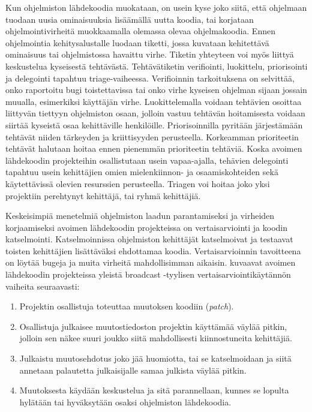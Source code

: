 \documentclass[utf8]{gradu3}
\begin{document}
Kun ohjelmiston lähdekoodia muokataan, on usein kyse joko siitä, että ohjelmaan
tuodaan uusia ominaisuuksia lisäämällä uutta koodia, tai korjataan 
ohjelmointivirheitä muokkaamalla olemassa olevaa ohjelmakoodia.
Ennen ohjelmointia kehitysalustalle luodaan tiketti, jossa kuvataan
kehitettävä ominaisuus tai ohjelmistossa havaittu virhe. Tiketin yhteyteen voi
myös liittyä keskustelua kyseisestä tehtävästä. Tehtävätiketin verifiointi,
luokittelu, priorisointi ja delegointi tapahtuu triage-vaiheessa. Verifioinnin
tarkoituksena on selvittää, onko raportoitu bugi toistettavissa tai onko virhe
kyseisen ohjelman sijaan jossain muualla, esimerkiksi käyttäjän virhe.
Luokittelemalla voidaan tehtävien osoittaa liittyvän tiettyyn ohjelmiston osaan,
jolloin vastuu tehtävän hoitamisesta voidaan siirtää kyseistä osaa kehittäville
henkilöille. Priorisoinnilla pyritään järjestämään tehtävät niiden tärkeyden ja
kriittisyyden perusteella. Korkeamman prioriteetin tehtävät halutaan hoitaa
ennen pienemmän prioriteetin tehtäviä. Koska avoimen lähdekoodin projekteihin
osallistutaan usein vapaa-ajalla, tehävien delegointi tapahtuu usein kehittäjien
omien mielenkiinnon- ja osaamiskohteiden sekä käytettävissä olevien resurssien
perusteella. Triagen voi hoitaa joko yksi projektiin perehtynyt kehittäjä, tai
ryhmä kehittäjiä.


Keskeisimpiä menetelmiä ohjelmiston laadun parantamiseksi ja virheiden
korjaamiseksi avoimen lähdekoodin projekteissa on vertaisarviointi ja koodin
katselmointi. \parencite{Rigby-2014} Katselmoinnissa ohjelmiston kehittäjät
katselmoivat ja testaavat toisten kehittäjien lisättäväksi ehdottamaa koodia.
Vertaisarvioinnin tavoitteena on löytää bugeja ja muita virheitä mahdollisimman
aikaisin. \textcite{Rigby-2014} kuvaavat avoimen lähdekoodin projekteissa
yleistä broadcast -tyylisen vertaisarviointikäytännön vaiheita seuraavasti:
\begin{enumerate}
  \item Projektin osallistuja toteuttaa muutoksen koodiin (\textit{patch}).
  \item Osallistuja julkaisee muutostiedoston projektin käyttämää väylää pitkin,
        jolloin sen näkee suuri joukko siitä mahdollisesti kiinnostuneita
        kehittäjiä.
  \item Julkaistu muutosehdotus joko jää huomiotta, tai se katselmoidaan ja
        siitä annetaan palautetta julkaisijalle samaa julkista väylää pitkin.
  \item Muutoksesta käydään keskustelua ja sitä parannellaan, kunnes se lopulta
        hylätään tai hyväksytään osaksi ohjelmiston lähdekoodia.
\end{enumerate}
\end{document}
